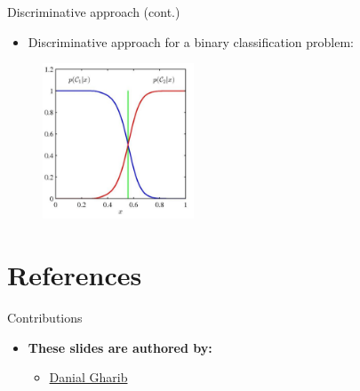 \documentclass[serif, aspectratio=169]{beamer}
\begin{document}
    \begin{frame}{Discriminative approach (cont.)}
        \begin{itemize}
            \item Discriminative approach for a binary classification problem:
        \end{itemize}
        \begin{figure}[h]
            \centering
            \includegraphics[width=0.4\textwidth]{pic/Disc.png}
        \end{figure}
        \vfill
    \end{frame}




    \section{References}

    \begin{frame}{Contributions}
        \begin{itemize}
            \item \textbf{These slides are authored by:}
            \begin{itemize}
                \setlength{\itemsep}{10pt} %
                \item \href{https://github.com/Danial-Gharib}{Danial Gharib}
            \end{itemize}
        \end{itemize}

    \end{frame}

    \begin{frame}[allowframebreaks]
        
        
        \nocite{*}
    \end{frame}
\end{document}
